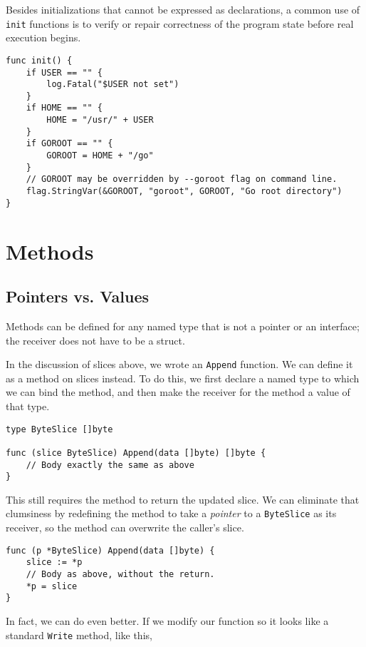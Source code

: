 Besides initializations that cannot be expressed as declarations, a
common use of \texttt{init} functions is to verify or repair correctness
of the program state before real execution begins.

\begin{Verbatim}[frame=single]
func init() {
    if USER == "" {
        log.Fatal("$USER not set")
    }
    if HOME == "" {
        HOME = "/usr/" + USER
    }
    if GOROOT == "" {
        GOROOT = HOME + "/go"
    }
    // GOROOT may be overridden by --goroot flag on command line.
    flag.StringVar(&GOROOT, "goroot", GOROOT, "Go root directory")
}
\end{Verbatim}

\section*{Methods}

\subsection*{Pointers vs. Values}

Methods can be defined for any named type that is not a pointer or an
interface; the receiver does not have to be a struct.

In the discussion of slices above, we wrote an \texttt{Append} function.
We can define it as a method on slices instead. To do this, we first
declare a named type to which we can bind the method, and then make the
receiver for the method a value of that type.

\begin{Verbatim}[frame=single]
type ByteSlice []byte

func (slice ByteSlice) Append(data []byte) []byte {
    // Body exactly the same as above
}
\end{Verbatim}

This still requires the method to return the updated slice. We can
eliminate that clumsiness by redefining the method to take a
\emph{pointer} to a \texttt{ByteSlice} as its receiver, so the method
can overwrite the caller's slice.

\begin{Verbatim}[frame=single]
func (p *ByteSlice) Append(data []byte) {
    slice := *p
    // Body as above, without the return.
    *p = slice
}
\end{Verbatim}

In fact, we can do even better. If we modify our function so it looks
like a standard \texttt{Write} method, like this,

